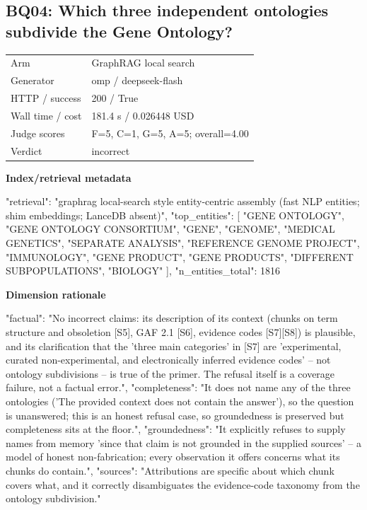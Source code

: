 \documentclass[10pt]{article}
\begin{document}
\subsection{BQ04: Which three independent ontologies subdivide the Gene Ontology?}
\begin{tabular}{@{}ll@{}}
Arm & GraphRAG local search\\
Generator & omp / deepseek-flash\\
HTTP / success & 200 / True\\
Wall time / cost & 181.4 s / 0.026448 USD\\
Judge scores & F=5, C=1, G=5, A=5; overall=4.00\\
Verdict & incorrect\\
\end{tabular}

\textbf{Index/retrieval metadata}
\begin{EvidenceText}
{
  "retrieval": "graphrag local-search style entity-centric assembly (fast NLP entities; shim embeddings; LanceDB absent)",
  "top_entities": [
    "GENE ONTOLOGY",
    "GENE ONTOLOGY CONSORTIUM",
    "GENE",
    "GENOME",
    "MEDICAL GENETICS",
    "SEPARATE ANALYSIS",
    "REFERENCE GENOME PROJECT",
    "IMMUNOLOGY",
    "GENE PRODUCT",
    "GENE PRODUCTS",
    "DIFFERENT SUBPOPULATIONS",
    "BIOLOGY"
  ],
  "n_entities_total": 1816
}
\end{EvidenceText}

\textbf{Dimension rationale}
\begin{EvidenceText}
{
  "factual": "No incorrect claims: its description of its context (chunks on term structure and obsoletion [S5], GAF 2.1 [S6], evidence codes [S7][S8]) is plausible, and its clarification that the 'three main categories' in [S7] are 'experimental, curated non-experimental, and electronically inferred evidence codes' -- not ontology subdivisions -- is true of the primer. The refusal itself is a coverage failure, not a factual error.",
  "completeness": "It does not name any of the three ontologies ('The provided context does not contain the answer'), so the question is unanswered; this is an honest refusal case, so groundedness is preserved but completeness sits at the floor.",
  "groundedness": "It explicitly refuses to supply names from memory 'since that claim is not grounded in the supplied sources' -- a model of honest non-fabrication; every observation it offers concerns what its chunks do contain.",
  "sources": "Attributions are specific about which chunk covers what, and it correctly disambiguates the evidence-code taxonomy from the ontology subdivision."
}
\end{EvidenceText}
\end{document}

